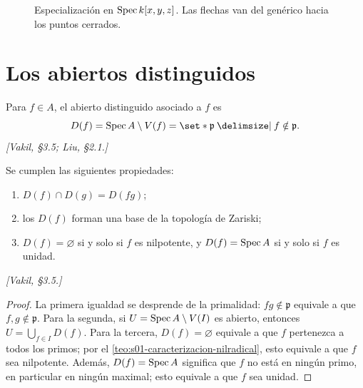 \begin{figure}[htbp]
\caption{Especialización en $\operatorname{Spec} k[x,y,z]$. Las flechas van del genérico hacia los puntos cerrados.}
\label{fig:s02-piramide-coliflor}
\end{figure}

\section{Los abiertos distinguidos}

\begin{defi}
\label{defi:s02-f-abierto-distinguido-asociado-f}
Para $f\in A$, el abierto distinguido asociado a $f$ es
\[
D(f)=\Spec A\setminus V(f)=\set*{\mathfrak p \given f\notin\mathfrak p}.
\]
\emph{[Vakil, \S3.5; Liu, \S2.1.]}
\end{defi}

\begin{prop}
\label{prop:s02-cumplen-siguientes-propiedades-d-f}
Se cumplen las siguientes propiedades:
\begin{enumerate}
\item $D(f)\cap D(g)=D(fg)$;
\item los $D(f)$ forman una base de la topología de Zariski;
\item $D(f)=\varnothing$ si y solo si $f$ es nilpotente, y $D(f)=\operatorname{Spec} A$ si y solo si $f$ es unidad.
\end{enumerate}
\emph{[Vakil, \S3.5.]}
\end{prop}
\begin{proof}
La primera igualdad se desprende de la primalidad: $fg\notin\mathfrak p$ equivale a que $f,g\notin\mathfrak p$. Para la segunda, si $U=\operatorname{Spec} A\setminus V(I)$ es abierto, entonces $U=\bigcup_{f\in I}D(f)$. Para la tercera, $D(f)=\varnothing$ equivale a que $f$ pertenezca a todos los primos; por el \cref{teo:s01-caracterizacion-nilradical}, esto equivale a que $f$ sea nilpotente. Además, $D(f)=\operatorname{Spec} A$ significa que $f$ no está en ningún primo, en particular en ningún maximal; esto equivale a que $f$ sea unidad.
\end{proof}

